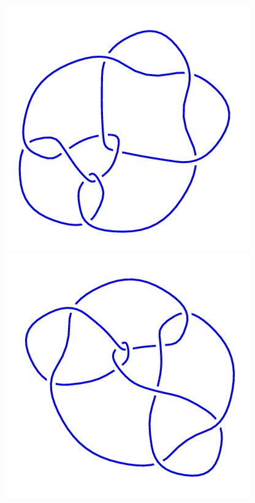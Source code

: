 \begin{figure}[H]
\begin{minipage}[b]{.18\linewidth}
	\end{minipage}
	\begin{minipage}[b]{.18\linewidth}
		\centering
		\includegraphics[width=\linewidth]{../data/10_149.png}
	\end{minipage}
	\begin{minipage}[b]{.18\linewidth}
		\centering
		\includegraphics[width=\linewidth]{../data/10_150.png}

\end{minipage}
\end{figure}
